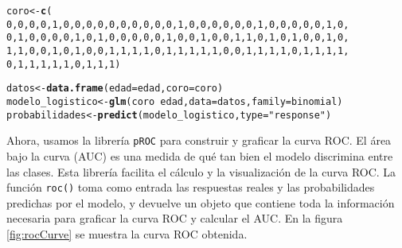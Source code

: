 \documentclass[paper=letter, fontsize=11pt, draft=false]{scrartcl}\usepackage[]{graphicx}\usepackage[]{xcolor}
\makeatletter
\newcommand{\hlnum}[1]{\textcolor[rgb]{0.686,0.059,0.569}{#1}}%
\newcommand{\hlsng}[1]{\textcolor[rgb]{0.192,0.494,0.8}{#1}}%
\newcommand{\hlopt}[1]{\textcolor[rgb]{0,0,0}{#1}}%
\newcommand{\hldef}[1]{\textcolor[rgb]{0.345,0.345,0.345}{#1}}%
\newcommand{\hlkwb}[1]{\textcolor[rgb]{0.69,0.353,0.396}{#1}}%
\newcommand{\hlkwc}[1]{\textcolor[rgb]{0.333,0.667,0.333}{#1}}%
\newcommand{\hlkwd}[1]{\textcolor[rgb]{0.737,0.353,0.396}{\textbf{#1}}}%
\newenvironment{kframe}{%
 \def\at@end@of@kframe{}%
 \ifinner\ifhmode%
  \def\at@end@of@kframe{\end{minipage}}%
  \begin{minipage}{\columnwidth}%
 \fi\fi%
 \def\FrameCommand##1{\hskip\@totalleftmargin \hskip-\fboxsep
 \colorbox{shadecolor}{##1}\hskip-\fboxsep
     \hskip-\linewidth \hskip-\@totalleftmargin \hskip\columnwidth}%
 \MakeFramed {\advance\hsize-\width
   \@totalleftmargin\z@ \linewidth\hsize
   \@setminipage}}%
 {\par\unskip\endMakeFramed%
 \at@end@of@kframe}
\newenvironment{knitrout}{}{} %
\numberwithin{equation}{problemcounter} %
\numberwithin{figure}{problemcounter} %
\numberwithin{table}{problemcounter} %
\numberwithin{subsection}{problemcounter}
\makeatother
\begin{document}
\begin{knitrout}
\begin{kframe}
\begin{alltt}
\hldef{coro} \hlkwb{<-} \hlkwd{c}\hldef{(}
    \hlnum{0}\hldef{,}\hlnum{0}\hldef{,}\hlnum{0}\hldef{,}\hlnum{0}\hldef{,}\hlnum{1}\hldef{,}\hlnum{0}\hldef{,}\hlnum{0}\hldef{,}\hlnum{0}\hldef{,}\hlnum{0}\hldef{,}\hlnum{0}\hldef{,}\hlnum{0}\hldef{,}\hlnum{0}\hldef{,}\hlnum{0}\hldef{,}\hlnum{0}\hldef{,}\hlnum{0}\hldef{,}\hlnum{1}\hldef{,}\hlnum{0}\hldef{,}\hlnum{0}\hldef{,}\hlnum{0}\hldef{,}\hlnum{0}\hldef{,}\hlnum{0}\hldef{,}\hlnum{0}\hldef{,}\hlnum{1}\hldef{,}\hlnum{0}\hldef{,}\hlnum{0}\hldef{,}\hlnum{0}\hldef{,}\hlnum{0}\hldef{,}\hlnum{0}\hldef{,}\hlnum{1}\hldef{,}\hlnum{0}\hldef{,}
    \hlnum{0}\hldef{,}\hlnum{1}\hldef{,}\hlnum{0}\hldef{,}\hlnum{0}\hldef{,}\hlnum{0}\hldef{,}\hlnum{0}\hldef{,}\hlnum{1}\hldef{,}\hlnum{0}\hldef{,}\hlnum{1}\hldef{,}\hlnum{0}\hldef{,}\hlnum{0}\hldef{,}\hlnum{0}\hldef{,}\hlnum{0}\hldef{,}\hlnum{0}\hldef{,}\hlnum{1}\hldef{,}\hlnum{0}\hldef{,}\hlnum{0}\hldef{,}\hlnum{1}\hldef{,}\hlnum{0}\hldef{,}\hlnum{0}\hldef{,}\hlnum{1}\hldef{,}\hlnum{1}\hldef{,}\hlnum{0}\hldef{,}\hlnum{1}\hldef{,}\hlnum{0}\hldef{,}\hlnum{1}\hldef{,}\hlnum{0}\hldef{,}\hlnum{0}\hldef{,}\hlnum{1}\hldef{,}\hlnum{0}\hldef{,}
    \hlnum{1}\hldef{,}\hlnum{1}\hldef{,}\hlnum{0}\hldef{,}\hlnum{0}\hldef{,}\hlnum{1}\hldef{,}\hlnum{0}\hldef{,}\hlnum{1}\hldef{,}\hlnum{0}\hldef{,}\hlnum{0}\hldef{,}\hlnum{1}\hldef{,}\hlnum{1}\hldef{,}\hlnum{1}\hldef{,}\hlnum{1}\hldef{,}\hlnum{0}\hldef{,}\hlnum{1}\hldef{,}\hlnum{1}\hldef{,}\hlnum{1}\hldef{,}\hlnum{1}\hldef{,}\hlnum{1}\hldef{,}\hlnum{0}\hldef{,}\hlnum{0}\hldef{,}\hlnum{1}\hldef{,}\hlnum{1}\hldef{,}\hlnum{1}\hldef{,}\hlnum{1}\hldef{,}\hlnum{0}\hldef{,}\hlnum{1}\hldef{,}\hlnum{1}\hldef{,}\hlnum{1}\hldef{,}\hlnum{1}\hldef{,}
    \hlnum{0}\hldef{,}\hlnum{1}\hldef{,}\hlnum{1}\hldef{,}\hlnum{1}\hldef{,}\hlnum{1}\hldef{,}\hlnum{1}\hldef{,}\hlnum{0}\hldef{,}\hlnum{1}\hldef{,}\hlnum{1}\hldef{,}\hlnum{1}\hldef{)}

\hldef{datos} \hlkwb{<-} \hlkwd{data.frame}\hldef{(}\hlkwc{edad} \hldef{= edad,} \hlkwc{coro} \hldef{= coro)}
\hldef{modelo_logistico} \hlkwb{<-} \hlkwd{glm}\hldef{(coro} \hlopt{~} \hldef{edad,} \hlkwc{data} \hldef{= datos,} \hlkwc{family} \hldef{= binomial)}
\hldef{probabilidades} \hlkwb{<-} \hlkwd{predict}\hldef{(modelo_logistico,} \hlkwc{type} \hldef{=} \hlsng{"response"}\hldef{)}
\end{alltt}
\end{kframe}
\end{knitrout}

Ahora, usamos la librería \texttt{pROC} para construir y graficar la curva ROC. El área bajo la curva (AUC) es una medida de qué tan bien el modelo discrimina entre las clases. Esta librería facilita el cálculo y la visualización de la curva ROC. La función \texttt{roc()} toma como entrada las respuestas reales y las probabilidades predichas por el modelo, y devuelve un objeto que contiene toda la información necesaria para graficar la curva ROC y calcular el AUC. En la figura \ref{fig:rocCurve} se muestra la curva ROC obtenida.
\end{document}
